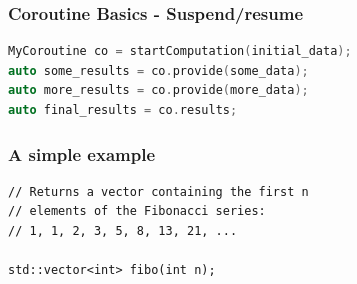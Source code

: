 \documentclass[aspectratio=169]{beamer}
\begin{document}
\begin{frame}[fragile]

\frametitle{Coroutine Basics - Suspend/resume}

  \begin{lstlisting}[language={C++}]
MyCoroutine co = startComputation(initial_data);
auto some_results = co.provide(some_data);
auto more_results = co.provide(more_data);
auto final_results = co.results;
  \end{lstlisting}
\end{frame}


\begin{frame}[fragile]
  \frametitle{A simple example}
  
  \begin{lstlisting}[style=cpp20]
// Returns a vector containing the first n
// elements of the Fibonacci series:
// 1, 1, 2, 3, 5, 8, 13, 21, ...

std::vector<int> fibo(int n);
  \end{lstlisting}
  
\end{frame}
\end{document}

